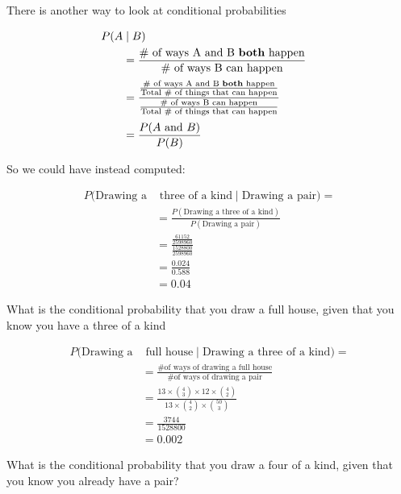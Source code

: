 %
\begin{frame}

There is another way to look at conditional probabilities

\begin{align*}
P(A & \mid B) & \\
%
&= \frac{\text{\# of ways A and B \textbf{both} happen}}{\text{\#
of ways B can happen}} \\[0.5ex]
%
&= \frac{\frac{\text{\# of ways A and B \textbf{both} happen}}{\text{Total \# of
things that can happen}}}{\frac{\text{\# of ways B can happen}}{\text{Total \# of
things that can happen}}} \\[0.5ex]
%
&= \frac{P(A \text{ and } B)}{P(B)}
\end{align*}

\end{frame}
%

%
\begin{frame}

So we could have instead computed:

\begin{align*}
P(\text{Drawing a} & \text{ three of a kind} \mid \text{Drawing a pair}) = \\
%
&= \frac{P(\text{Drawing a three of a kind})}{P(\text{Drawing a pair})} \\
%
&= \frac{\frac{61152}{2598960}}{\frac{1528800}{2598960}} \\
%
&= \frac{0.024}{0.588} \\
%
&= 0.04
\end{align*}

\end{frame}
%

%
\begin{frame}

What is the conditional probability that you draw a full house, given that you know you
have a three of a kind

\begin{align*}
P(\text{Drawing a} & \text{ full house} \mid \text{Drawing a three of a kind}) = \\
%
&= \frac{\text{\# of ways of drawing a full house}}{\text{\# of ways of drawing
a pair}} \\
%
&= \frac{ 13 \times {{4}\choose{3}} \times 12 \times {{4}\choose{2}} } {13
\times {{4}\choose{2}} \times {{50}\choose{3}}} \\
%
%
&= \frac{3744}{1528800} \\
%
&= 0.002
\end{align*}

\end{frame}
%

%
\begin{frame}
What is the conditional probability that you draw a four of a kind, given that
you know you already have a pair?
\end{frame}
